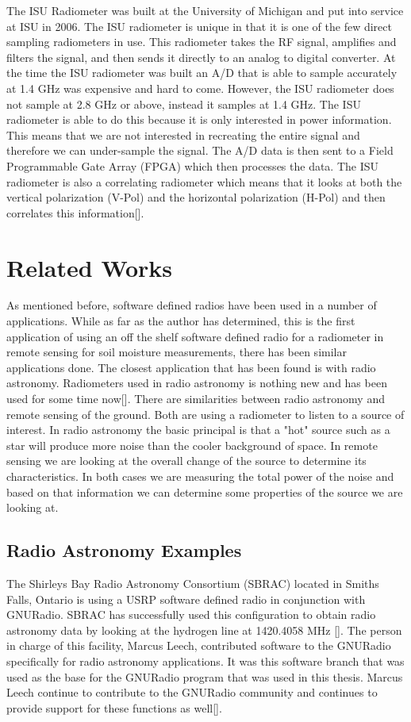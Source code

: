 The ISU Radiometer was built at the University of Michigan and put into service at ISU in 2006.  The ISU radiometer is unique in that it is one of the few direct sampling radiometers in use\cite{Erbas}.  This radiometer takes the RF signal, amplifies and filters the signal, and then sends it directly to an analog to digital converter.  At the time the ISU radiometer was built an A/D that is able to sample accurately at 1.4 GHz was expensive and hard to come.  However, the ISU radiometer does not sample at 2.8 GHz or above, instead it samples at 1.4 GHz.  The ISU radiometer is able to do this because it is only interested in power information.  This means that we are not interested in recreating the entire signal and therefore we can under-sample the signal.  The A/D data is then sent to a Field Programmable Gate Array (FPGA) which then processes the data.  The ISU radiometer is also a correlating radiometer which means that it looks at both the vertical polarization (V-Pol) and the horizontal polarization (H-Pol) and then correlates this information[\cite{Fischman2001}].  

\section{Related Works}
As mentioned before, software defined radios have been used in a number of applications.  While as far as the author has determined, this is the first application of using an off the shelf software defined radio for a radiometer in remote sensing for soil moisture measurements, there has been similar applications done.  The closest application that has been found is with radio astronomy.  Radiometers used in radio astronomy is nothing new and has been used for some time now[\cite{Ohm}]. There are similarities between radio astronomy and remote sensing of the ground.  Both are using a radiometer to listen to a source of interest.  In radio astronomy the basic principal is that a "hot" source such as a star will produce more noise than the cooler background of space.  In remote sensing we are looking at the overall change of the source to determine its characteristics.  In both cases we are measuring the total power of the noise and based on that information we can determine some properties of the source we are looking at.

\subsection{Radio Astronomy Examples}
The Shirleys Bay Radio Astronomy Consortium (SBRAC) located in Smiths Falls, Ontario is using a USRP software defined radio in conjunction with GNURadio.  SBRAC has successfully used this configuration to obtain radio astronomy data by looking at the hydrogen line at 1420.4058 MHz [\cite{Leech2007}].  The person in charge of this facility, Marcus Leech, contributed software to the GNURadio specifically for radio astronomy applications.  It was this software branch that was used as the base for the GNURadio program that was used in this thesis.  Marcus Leech continue to contribute to the GNURadio community and continues to provide support for these functions as well[\cite{Leech}].

